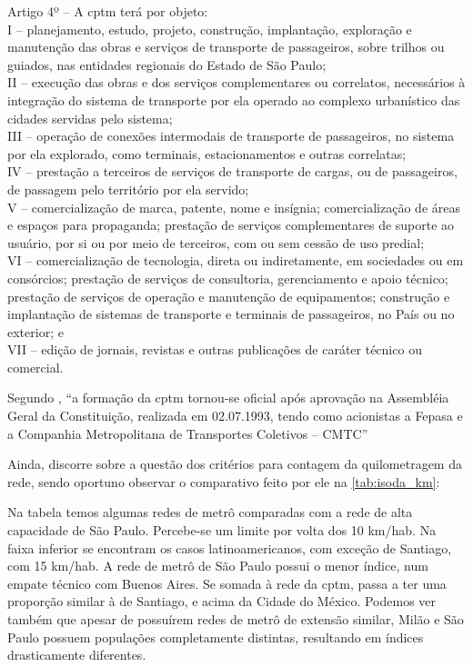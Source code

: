\documentclass[11pt,fleqn]{book} %
\begin{document}
\begin{citacao}
	Artigo 4º -- A \gls{cptm} terá por objeto:\\
	I -- planejamento, estudo, projeto, construção, implantação, exploração e manutenção das obras e serviços de transporte de passageiros, sobre trilhos ou guiados, nas entidades regionais do Estado de São Paulo;\\
	II -- execução das obras e dos serviços complementares ou correlatos, necessários à integração do sistema de transporte por ela operado ao complexo urbanístico das cidades servidas pelo sistema; \\
	III --  operação de conexões intermodais de transporte de passageiros, no sistema por ela explorado, como terminais, estacionamentos e outras correlatas;\\
	IV -- prestação a terceiros de serviços de transporte de cargas, ou de passageiros, de passagem pelo território por ela servido;\\
	V -- comercialização de marca, patente, nome e insígnia; comercialização de áreas e espaços para propaganda; prestação de serviços complementares de suporte ao usuário, por si ou por meio de terceiros, com ou sem cessão de uso predial;\\
	VI -- comercialização de tecnologia, direta ou indiretamente, em sociedades ou em consórcios; prestação de serviços de consultoria, gerenciamento e apoio técnico; prestação de serviços de operação e manutenção de equipamentos; construção e implantação de sistemas de transporte e terminais de passageiros, no País ou no exterior; e\\
	VII -- edição de jornais, revistas e outras publicações de caráter técnico ou comercial.\cite{lei7861}
\end{citacao}
	
Segundo \cite[p. 236]{Stefani}, ``a formação da \gls{cptm} tornou-se oficial após aprovação na Assembléia Geral da	Constituição, realizada em 02.07.1993, tendo como acionistas a Fepasa e a Companhia Metropolitana de Transportes Coletivos – CMTC''

Ainda, \cite[p. 42]{Isoda} discorre sobre a questão dos critérios para contagem da quilometragem da rede, sendo oportuno observar o comparativo feito por ele na \autoref{tab:isoda_km}:

\begin{citacao}
	Na tabela temos algumas redes de metrô comparadas com a rede de alta capacidade de São Paulo. Percebe-se um limite por volta dos 10 km/hab. Na faixa inferior se encontram os casos latinoamericanos, com exceção de Santiago, com 15 km/hab. A rede de metrô de São Paulo possui o menor índice, num empate técnico com Buenos Aires. Se somada à rede da \gls{cptm}, passa a ter uma proporção similar à de Santiago, e acima da Cidade do México. Podemos ver também que apesar de possuírem redes de metrô de extensão similar, Milão e São Paulo possuem populações completamente distintas, resultando em índices drasticamente diferentes.
\end{citacao}
\end{document}
